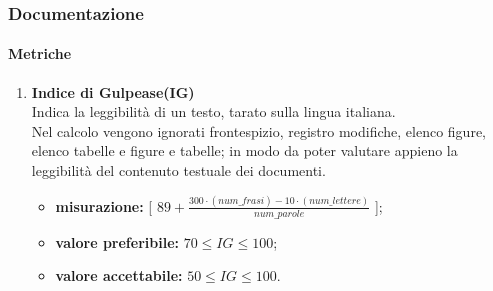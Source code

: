 \subsubsection{Documentazione}
\paragraph{Metriche}
\begin{enumerate}
	\item[]
	      \textbf{Indice di Gulpease(IG)}\\
	      Indica la leggibilità di un testo, tarato sulla lingua italiana.\\Nel calcolo vengono ignorati frontespizio, registro modifiche, elenco figure, elenco tabelle e figure e tabelle; in modo da poter valutare appieno la leggibilità del contenuto testuale dei documenti.
	      \begin{itemize}
		      \item \textbf{misurazione:} [ $89+ \frac{300\cdot (num\_frasi) - 10\cdot (num\_lettere)}{num\_parole}$ ];
		      \item \textbf{valore preferibile:} $70\leq IG\leq 100$;
		      \item \textbf{valore accettabile:} $50\leq IG\leq 100$.
	      \end{itemize}
\end{enumerate}
\pagebreak
